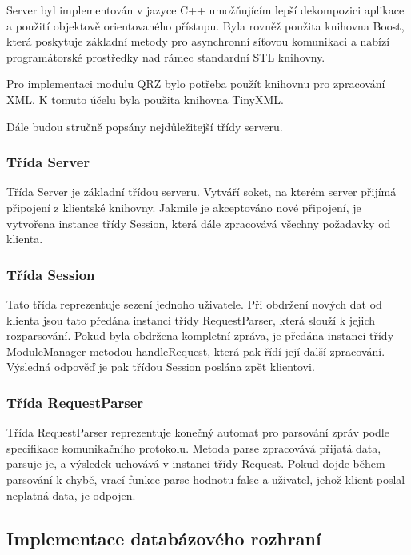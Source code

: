 Server byl implementován v jazyce C++ umožňujícím lepší dekompozici aplikace a
použití objektově orientovaného přístupu. Byla rovněž
použita knihovna Boost, která poskytuje základní metody pro asynchronní síťovou komunikaci a nabízí programátorské prostředky
nad rámec standardní STL knihovny.

Pro implementaci modulu QRZ bylo potřeba použít knihovnu pro zpracování XML. K
tomuto účelu byla použita knihovna TinyXML.

Dále budou stručně popsány nejdůležitejší třídy serveru.

\subsubsection{Třída Server}

Třída Server je základní třídou serveru. Vytváří soket, na kterém server přijímá připojení z klientské knihovny. Jakmile je 
akceptováno nové připojení, je vytvořena instance třídy Session, která dále
zpracovává všechny požadavky od klienta.

\subsubsection{Třída Session}

Tato třída reprezentuje sezení jednoho uživatele. Při obdržení nových dat od klienta jsou tato předána instanci třídy
RequestParser, která slouží k jejich rozparsování. Pokud byla obdržena kompletní zpráva, je předána instanci třídy 
ModuleManager metodou handleRequest, která pak řídí její další zpracování. Výsledná odpověď je pak třídou Session poslána
zpět klientovi.

\subsubsection{Třída RequestParser}

Třída RequestParser reprezentuje konečný automat pro parsování zpráv podle specifikace komunikačního protokolu.
Metoda parse zpracovává přijatá data, parsuje je, a výsledek uchovává v instanci třídy Request. Pokud dojde během parsování
k chybě, vrací funkce parse hodnotu false a uživatel, jehož klient poslal
neplatná data, je odpojen.

\subsection{Implementace databázového rozhraní}
\label{implementace_db}


